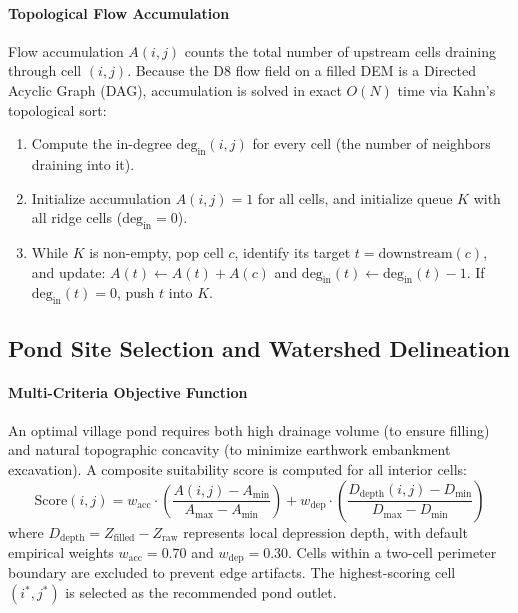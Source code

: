 \documentclass[manuscript,screen,review]{acmart}
\begin{document}
\paragraph{Topological Flow Accumulation}
Flow accumulation $A(i, j)$ counts the total number of upstream cells draining through cell $(i, j)$.
Because the D8 flow field on a filled DEM is a Directed Acyclic Graph (DAG), accumulation is
solved in exact $O(N)$ time via Kahn's topological sort:
\begin{enumerate}
  \item Compute the in-degree $\text{deg}_{\text{in}}(i, j)$ for every cell (the number of neighbors draining into it).
  \item Initialize accumulation $A(i, j) = 1$ for all cells, and initialize queue $K$ with all ridge cells ($\text{deg}_{\text{in}} = 0$).
  \item While $K$ is non-empty, pop cell $c$, identify its target $t = \text{downstream}(c)$, and update:
    $A(t) \leftarrow A(t) + A(c)$ and $\text{deg}_{\text{in}}(t) \leftarrow \text{deg}_{\text{in}}(t) - 1$.
    If $\text{deg}_{\text{in}}(t) = 0$, push $t$ into $K$.
\end{enumerate}

\subsection{Pond Site Selection and Watershed Delineation}

\paragraph{Multi-Criteria Objective Function}
An optimal village pond requires both high drainage volume (to ensure filling) and natural topographic
concavity (to minimize earthwork embankment excavation). A composite suitability score is computed
for all interior cells:
\begin{equation}
  \text{Score}(i, j) = w_{\text{acc}} \cdot \left( \frac{A(i, j) - A_{\min}}{A_{\max} - A_{\min}} \right)
  + w_{\text{dep}} \cdot \left( \frac{D_{\text{depth}}(i, j) - D_{\min}}{D_{\max} - D_{\min}} \right)
\end{equation}
where $D_{\text{depth}} = Z_{\text{filled}} - Z_{\text{raw}}$ represents local depression depth,
with default empirical weights $w_{\text{acc}} = 0.70$ and $w_{\text{dep}} = 0.30$.
Cells within a two-cell perimeter boundary are excluded to prevent edge artifacts.
The highest-scoring cell $(i^*, j^*)$ is selected as the recommended pond outlet.
\end{document}

